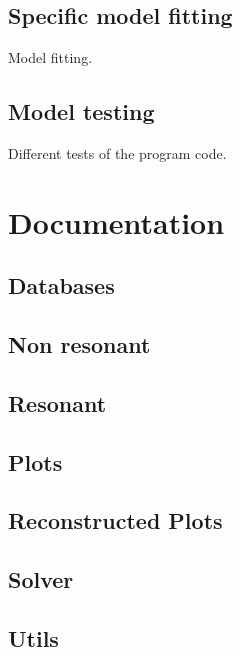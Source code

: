 \documentclass[openany]{book}
\begin{document}
\subsection{Specific model fitting}  \label{sub:codesModelFitting}

Model fitting.

\subsection{Model testing} \label{sub:codesModelTesting}

Different tests of the program code. 

\section{Documentation} \label{sec:documentation}

\subsection{Databases} \label{sub:codesDatabases}

\subsection{Non resonant} \label{sub:codesNonResonant}
\subsection{Resonant} \label{sub:codesResonant}
\subsection{Plots} \label{sub:codesPlots}
\subsection{Reconstructed Plots} \label{sub:codesReconstructedPlots}
\subsection{Solver} \label{sub:codesSolver}
\subsection{Utils} \label{sub:codesUtils}

\newpage


\end{document}
